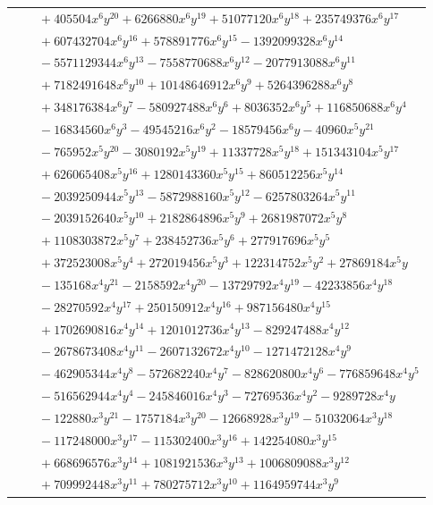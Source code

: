 \documentclass[11pt]{article}
\begin{document}
\begin{longtable}{@{}ll@{}}
 & $\quad +405504x^{6}y^{20}+6266880x^{6}y^{19}+51077120x^{6}y^{18}+235749376x^{6}y^{17}$\\
 & $\quad +607432704x^{6}y^{16}+578891776x^{6}y^{15}-1392099328x^{6}y^{14}$\\
 & $\quad -5571129344x^{6}y^{13}-7558770688x^{6}y^{12}-2077913088x^{6}y^{11}$\\
 & $\quad +7182491648x^{6}y^{10}+10148646912x^{6}y^{9}+5264396288x^{6}y^{8}$\\
 & $\quad +348176384x^{6}y^{7}-580927488x^{6}y^{6}+8036352x^{6}y^{5}+116850688x^{6}y^{4}$\\
 & $\quad -16834560x^{6}y^{3}-49545216x^{6}y^{2}-18579456x^{6}y-40960x^{5}y^{21}$\\
 & $\quad -765952x^{5}y^{20}-3080192x^{5}y^{19}+11337728x^{5}y^{18}+151343104x^{5}y^{17}$\\
 & $\quad +626065408x^{5}y^{16}+1280143360x^{5}y^{15}+860512256x^{5}y^{14}$\\
 & $\quad -2039250944x^{5}y^{13}-5872988160x^{5}y^{12}-6257803264x^{5}y^{11}$\\
 & $\quad -2039152640x^{5}y^{10}+2182864896x^{5}y^{9}+2681987072x^{5}y^{8}$\\
 & $\quad +1108303872x^{5}y^{7}+238452736x^{5}y^{6}+277917696x^{5}y^{5}$\\
 & $\quad +372523008x^{5}y^{4}+272019456x^{5}y^{3}+122314752x^{5}y^{2}+27869184x^{5}y$\\
 & $\quad -135168x^{4}y^{21}-2158592x^{4}y^{20}-13729792x^{4}y^{19}-42233856x^{4}y^{18}$\\
 & $\quad -28270592x^{4}y^{17}+250150912x^{4}y^{16}+987156480x^{4}y^{15}$\\
 & $\quad +1702690816x^{4}y^{14}+1201012736x^{4}y^{13}-829247488x^{4}y^{12}$\\
 & $\quad -2678673408x^{4}y^{11}-2607132672x^{4}y^{10}-1271472128x^{4}y^{9}$\\
 & $\quad -462905344x^{4}y^{8}-572682240x^{4}y^{7}-828620800x^{4}y^{6}-776859648x^{4}y^{5}$\\
 & $\quad -516562944x^{4}y^{4}-245846016x^{4}y^{3}-72769536x^{4}y^{2}-9289728x^{4}y$\\
 & $\quad -122880x^{3}y^{21}-1757184x^{3}y^{20}-12668928x^{3}y^{19}-51032064x^{3}y^{18}$\\
 & $\quad -117248000x^{3}y^{17}-115302400x^{3}y^{16}+142254080x^{3}y^{15}$\\
 & $\quad +668696576x^{3}y^{14}+1081921536x^{3}y^{13}+1006809088x^{3}y^{12}$\\
 & $\quad +709992448x^{3}y^{11}+780275712x^{3}y^{10}+1164959744x^{3}y^{9}$\\

\end{longtable}
\end{document}
